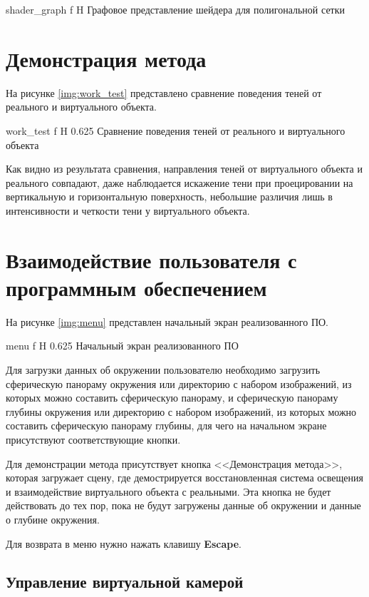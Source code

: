{shader_graph}
{f}
{H}
{\textwidth}
{Графовое представление шейдера для полигональной сетки}

\section{Демонстрация метода}

На рисунке \ref{img:work_test} представлено сравнение поведения теней от реального и виртуального объекта.

{work_test}
{f}
{H}
{0.625\textwidth}
{Сравнение поведения теней от реального и виртуального объекта}

Как видно из результата сравнения, направления теней от виртуального объекта и реального совпадают, даже наблюдается искажение тени при проецировании на вертикальную и горизонтальную поверхность, небольшие различия лишь в интенсивности и четкости тени у виртуального объекта.

\section{Взаимодействие пользователя с программным обеспечением}

На рисунке \ref{img:menu} представлен начальный экран реализованного ПО.

{menu}
{f}
{H}
{0.625\textwidth}
{Начальный экран реализованного ПО}

Для загрузки данных об окружении пользователю необходимо загрузить сферическую панораму окружения или директорию с набором изображений, из которых можно составить сферическую панораму, и сферическую панораму глубины окружения или директорию с набором изображений, из которых можно составить сферическую панораму глубины, для чего на начальном экране присутствуют соответствующие кнопки.

Для демонстрации метода присутствует кнопка <<Демонстрация метода>>, которая загружает сцену, где демострируется восстановленная система освещения и взаимодействие виртуального объекта с реальными. Эта кнопка не будет действовать до тех пор, пока не будут загружены данные об окружении и данные о глубине окружения. 

Для возврата в меню нужно нажать клавишу \textbf{Escape}.

\subsection{Управление виртуальной камерой}

